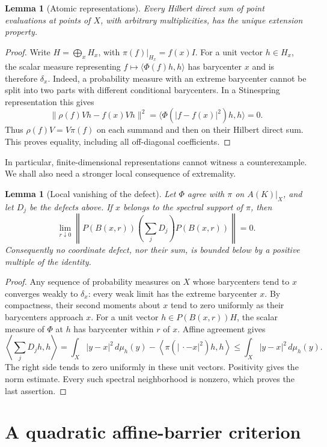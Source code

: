 \documentclass[11pt,letterpaper]{amsart}
\newtheorem{lemma}[theorem]{Lemma}
\theoremstyle{definition}
\theoremstyle{remark}
\numberwithin{equation}{section}
\begin{document}
\begin{lemma}[Atomic representations]\label{lem:atomic}
Every Hilbert direct sum of point evaluations at points of $X$,
with arbitrary multiplicities, has the unique extension property.
\end{lemma}
\begin{proof}
Write $H=\bigoplus_x H_x$, with $\pi(f)|_{H_x}=f(x)I$.
For a unit vector $h\in H_x$, the scalar measure representing
$f\mapsto\langle\Phi(f)h,h\rangle$ has barycenter $x$ and is therefore
$\delta_x$. Indeed, a probability measure with an extreme barycenter
cannot be split into two parts with different conditional barycenters.
In a Stinespring representation this gives
\[
 \|\rho(f)Vh-f(x)Vh\|^2
       =\langle\Phi(|f-f(x)|^2)h,h\rangle=0.
\]
Thus $\rho(f)V=V\pi(f)$ on each summand and then on their Hilbert direct
sum. This proves equality, including all off-diagonal coefficients.
\end{proof}

In particular, finite-dimensional representations cannot witness a
counterexample. We shall also need a stronger local consequence of
extremality.

\begin{lemma}[Local vanishing of the defect]\label{het:lem:local}
Let $\Phi$ agree with $\pi$ on $A(K)|_X$, and let $D_j$ be the defects
above. If $x$ belongs to the spectral support of $\pi$, then
\[
 \lim_{r\downarrow0}
 \left\|P(B(x,r))\left(\sum_jD_j\right)P(B(x,r))\right\|=0.
\]
Consequently no coordinate defect, nor their sum, is bounded below by
a positive multiple of the identity.
\end{lemma}
\begin{proof}
Any sequence of probability measures on $X$ whose barycenters tend to
$x$ converges weakly to $\delta_x$: every weak limit has the extreme
barycenter $x$. By compactness, their second moments about $x$ tend
to zero uniformly as their barycenters approach $x$.
For a unit vector $h\in P(B(x,r))H$, the scalar measure of $\Phi$
at $h$ has barycenter within $r$ of $x$. Affine agreement gives
\[
 \left\langle\sum_jD_jh,h\right\rangle
 =\int_X|y-x|^2\,d\mu_h(y)
   -\left\langle\pi(|\,\cdot-x|^2)h,h\right\rangle
 \le\int_X|y-x|^2\,d\mu_h(y).
\]
The right side tends to zero uniformly in these unit vectors.
Positivity gives the norm estimate. Every such spectral neighborhood
is nonzero, which proves the last assertion.
\end{proof}

\section{A quadratic affine-barrier criterion}
\label{paper:pos:barriers}
\end{document}
